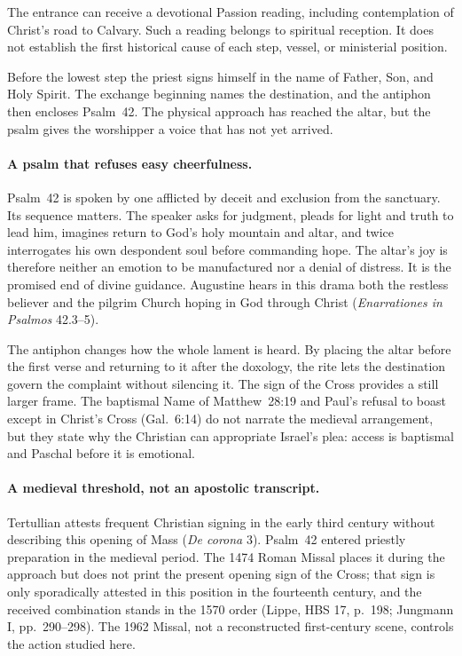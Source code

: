 The entrance can receive a devotional Passion reading, including contemplation of Christ's road to Calvary. Such a reading belongs to spiritual reception. It does not establish the first historical cause of each step, vessel, or ministerial position.


Before the lowest step the priest signs himself in the name of Father, Son, and Holy Spirit. The exchange beginning  names the destination, and the antiphon then encloses Psalm~42. The physical approach has reached the altar, but the psalm gives the worshipper a voice that has not yet arrived.

\paragraph{A psalm that refuses easy cheerfulness.}
Psalm~42 is spoken by one afflicted by deceit and exclusion from the sanctuary. Its sequence matters. The speaker asks for judgment, pleads for light and truth to lead him, imagines return to God's holy mountain and altar, and twice interrogates his own despondent soul before commanding hope. The altar's joy is therefore neither an emotion to be manufactured nor a denial of distress. It is the promised end of divine guidance. Augustine hears in this drama both the restless believer and the pilgrim Church hoping in God through Christ (\emph{Enarrationes in Psalmos} 42.3--5).

The antiphon changes how the whole lament is heard. By placing the altar before the first verse and returning to it after the doxology, the rite lets the destination govern the complaint without silencing it. The sign of the Cross provides a still larger frame. The baptismal Name of Matthew~28:19 and Paul's refusal to boast except in Christ's Cross (Gal.~6:14) do not narrate the medieval arrangement, but they state why the Christian can appropriate Israel's plea: access is baptismal and Paschal before it is emotional.

\paragraph{A medieval threshold, not an apostolic transcript.}
Tertullian attests frequent Christian signing in the early third century without describing this opening of Mass (\emph{De corona} 3). Psalm~42 entered priestly preparation in the medieval period. The 1474 Roman Missal places it during the approach but does not print the present opening sign of the Cross; that sign is only sporadically attested in this position in the fourteenth century, and the received combination stands in the 1570 order (Lippe, HBS 17, p.~198; Jungmann I, pp.~290--298). The 1962 Missal, not a reconstructed first-century scene, controls the action studied here.

